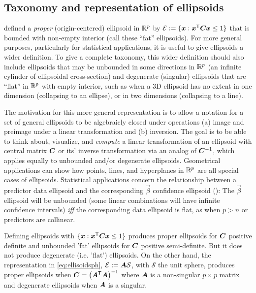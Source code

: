 \subsection{Taxonomy and representation of ellipsoids}\label{sec:taxonomy}
 defined a \emph{proper} (origin-centered) ellipsoid in  $\mathbb{R}^{p}$ by
$\mathcal{E} := \{ \bm{x}: \bm{x}^\mathsf{T} \bm{C} \bm{x} \le 1 \}$ that is bounded with non-empty interior (call these ``fat'' ellipsoids).
For more general purposes, particularly for statistical applications,
it is useful to give ellipsoids a wider definition.
To give a complete taxonomy, this wider definition should also include ellipsoids that may be unbounded in some directions in $\mathbb{R}^{p}$
(an infinite cylinder of ellipsoidal cross-section) and
degenerate (singular) ellipsoids that are ``flat'' in  $\mathbb{R}^{p}$ with empty interior, such as when a 3D ellipsoid has no extent in
one dimension (collapsing to an ellipse), or in two dimensions (collapsing to a line).

The motivation for this more general representation is to allow a notation for a set of general ellipsoids to be
algebraicly closed under operations (a) image and preimage under a linear transformation and (b) inversion.
The goal is to be able to think about, visualize, and \emph{compute} a linear transformation of an ellipsoid with central matrix
$\bm{C}$ or its' inverse transformation via an analog of $\bm{C}^{-1}$, which applies equally to unbounded
and/or degenerate ellipsoids. Geometrical applications can show how points, lines, and hyperplanes 
in  $\mathbb{R}^{p}$ are all special cases of ellipsoids.
Statistical applications concern the relationship between a predictor data ellipsoid and the
corresponding $\vec{\beta}$ confidence ellipsoid (): The $\vec{\beta}$ ellipsoid will be unbounded (some linear combinations
will have infinite confidence intervals) \emph{iff} the corresponding data ellipsoid is flat, as when $p>n$ or predictors are collinear.

Defining ellipsoids with $\{ \bm{x}: \bm{x}^\mathsf{T} \bm{C} \bm{x} \le 1 \}$ produces proper ellipsoids for $\bm{C}$
positive definite and unbounded 'fat' ellipsoids for $\bm{C}$ positive semi-definite.
But it does not produce degenerate (i.e. 'flat') ellipsoids.  On the other hand,
the representation in \eqref{eq:ellisoidsph},
$\mathcal{E} := \bm{A} \mathcal{S}$, with $\mathcal{S}$ the unit sphere,
 produces proper ellipsoids when $\bm{C} = \left( \bm{A} ^\mathsf{T} \bm{A} \right)^{-1}$
where $\bm{A}$ is a non-singular $p \times p$ matrix and degenerate ellipsoids when $\bm{A}$ is a singular.

